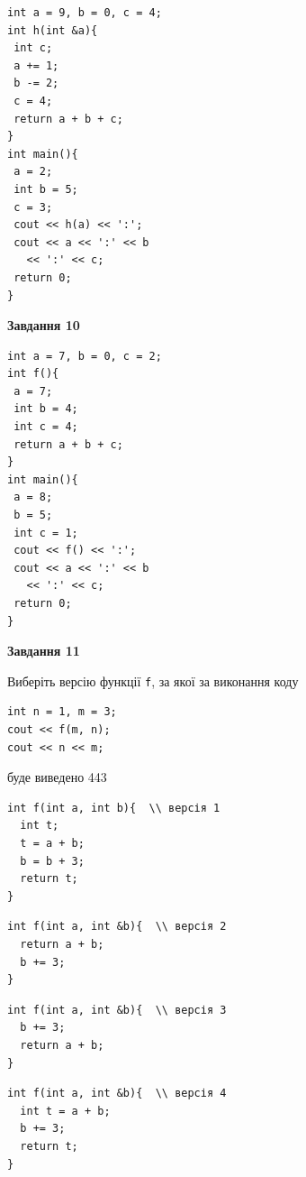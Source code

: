\documentclass[12pt, ukrainian]{article}
\def\code#1{\Verb!#1!}
\begin{document}
{\begin {large}
\begin{minipage}[t]{7.0cm}
\begin{verbatim}
int a = 9, b = 0, c = 4;
int h(int &a){
 int c;
 a += 1;
 b -= 2;
 c = 4;
 return a + b + c;
}
int main(){
 a = 2;
 int b = 5;
 c = 3;
 cout << h(a) << ':';
 cout << a << ':' << b 
   << ':' << c;
 return 0;
}
\end{verbatim}



\begin{center}
\textbf{Завдання 10}
\end{center}
\vspace{-8mm}

\begin{verbatim}
int a = 7, b = 0, c = 2;
int f(){
 a = 7;
 int b = 4;
 int c = 4;
 return a + b + c;
}
int main(){
 a = 8;
 b = 5;
 int c = 1;
 cout << f() << ':';
 cout << a << ':' << b 
   << ':' << c;
 return 0;
}
\end{verbatim}

\end{minipage}
\vline \hspace{1mm}
\begin{minipage}[t]{11.0cm}

\begin{center}
\textbf{Завдання 11}
\end{center}
Виберіть версію функції \code{f}, за якої за виконання коду
\begin{verbatim}
int n = 1, m = 3;
cout << f(m, n);
cout << n << m;
\end{verbatim}

буде виведено 443

\begin{verbatim}
int f(int a, int b){  \\ версія 1
  int t;
  t = a + b;
  b = b + 3;
  return t;
}
\end{verbatim}

\vspace{-8mm}\begin{verbatim}
int f(int a, int &b){  \\ версія 2
  return a + b;
  b += 3;
}
\end{verbatim}

\vspace{-8mm}\begin{verbatim}
int f(int a, int &b){  \\ версія 3
  b += 3;
  return a + b;
}
\end{verbatim}

\vspace{-8mm}\begin{verbatim}
int f(int a, int &b){  \\ версія 4
  int t = a + b;
  b += 3;
  return t;
}
\end{verbatim}




\end{minipage}
\end{large}}
\end{document}
